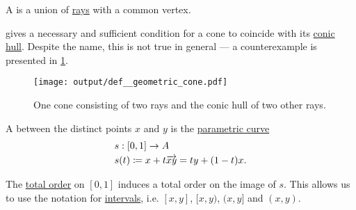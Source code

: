 \begin{definition}\label{def:geometric_cone}
  A  is a union of \hyperref[def:geometric_ray]{rays} with a common vertex.

   gives a necessary and sufficient condition for a cone to coincide with its \hyperref[def:conic_hull]{conic hull}. Despite the name, this is not true in general --- a counterexample is presented in \cref{fig:def:geometric_cone}.

  \begin{figure}[!ht]
    \centering
    \texttt{[image: output/def\_\_geometric\_cone.pdf]}
    \caption{One cone consisting of two rays and the conic hull of two other rays.}\label{fig:def:geometric_cone}
  \end{figure}
\end{definition}

\begin{definition}\label{def:line_segment}
  A  between the distinct points \( x \) and \( y \) is the \hyperref[def:parametric_curve]{parametric curve}
  \begin{equation*}
    \begin{aligned}
      &s: [0, 1] \to A \\
      &s(t) \coloneqq x + t \overrightarrow{xy} = t y + (1 - t) x.
    \end{aligned}
  \end{equation*}

  The \hyperref[def:totally_ordered_set]{total order} on \( [0, 1] \) induces a total order on the image of \( s \). This allows us to use the notation for \hyperref[def:partially_ordered_set_interval]{intervals}, i.e. \( [x, y] \), \( [x, y) \), \( (x, y] \) and \( (x, y) \).
\end{definition}

